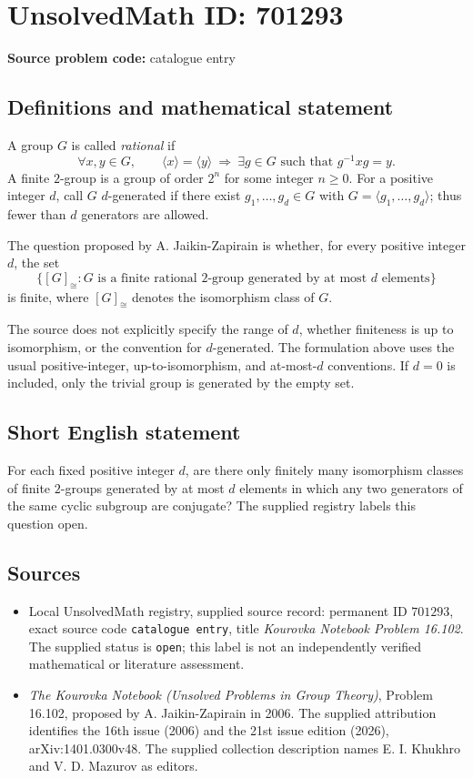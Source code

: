 \documentclass[11pt]{article}
\begin{document}
\section*{UnsolvedMath ID: 701293}
\textbf{Source problem code:} catalogue entry
\subsection{Definitions and mathematical statement}
A group \(G\) is called \emph{rational} if
\[
\forall x,y\in G,\qquad \langle x\rangle=\langle y\rangle\ \Longrightarrow\ \exists g\in G\text{ such that }g^{-1}xg=y.
\]
A finite \(2\)-group is a group of order \(2^n\) for some integer \(n\geq 0\). For a positive integer \(d\), call \(G\) \(d\)-generated if there exist \(g_1,\ldots,g_d\in G\) with \(G=\langle g_1,\ldots,g_d\rangle\); thus fewer than \(d\) generators are allowed.

The question proposed by A. Jaikin-Zapirain is whether, for every positive integer \(d\), the set
\[
\bigl\{[G]_{\cong}: G\text{ is a finite rational }2\text{-group generated by at most }d\text{ elements}\bigr\}
\]
is finite, where \([G]_{\cong}\) denotes the isomorphism class of \(G\).

The source does not explicitly specify the range of \(d\), whether finiteness is up to isomorphism, or the convention for \(d\)-generated. The formulation above uses the usual positive-integer, up-to-isomorphism, and at-most-\(d\) conventions. If \(d=0\) is included, only the trivial group is generated by the empty set.
\subsection{Short English statement}
For each fixed positive integer \(d\), are there only finitely many isomorphism classes of finite \(2\)-groups generated by at most \(d\) elements in which any two generators of the same cyclic subgroup are conjugate? The supplied registry labels this question open.
\subsection{Sources}
\begin{itemize}
\item Local UnsolvedMath registry, supplied source record: permanent ID \(701293\), exact source code \texttt{catalogue entry}, title \emph{Kourovka Notebook Problem 16.102}. The supplied status is \texttt{open}; this label is not an independently verified mathematical or literature assessment.
\item \emph{The Kourovka Notebook (Unsolved Problems in Group Theory)}, Problem 16.102, proposed by A. Jaikin-Zapirain in 2006. The supplied attribution identifies the 16th issue (2006) and the 21st issue edition (2026), arXiv:1401.0300v48. The supplied collection description names E. I. Khukhro and V. D. Mazurov as editors.
\end{itemize}
\end{document}
